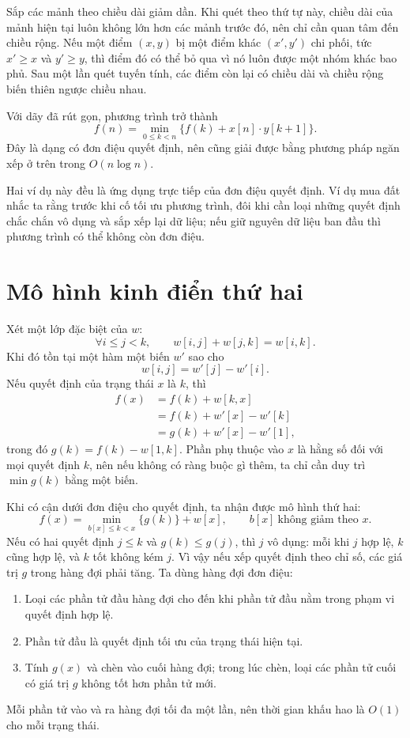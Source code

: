 \documentclass[11pt]{article}
\begin{document}
Sắp các mảnh theo chiều dài giảm dần. Khi quét theo thứ tự này, chiều dài
của mảnh hiện tại luôn không lớn hơn các mảnh trước đó, nên chỉ cần quan tâm
đến chiều rộng. Nếu một điểm $(x,y)$ bị một điểm khác $(x',y')$ chi phối, tức
$x'\ge x$ và $y'\ge y$, thì điểm đó có thể bỏ qua vì nó luôn được một nhóm
khác bao phủ. Sau một lần quét tuyến tính, các điểm còn lại có chiều dài và
chiều rộng biến thiên ngược chiều nhau.

Với dãy đã rút gọn, phương trình trở thành
\[
  f(n)=\min_{0\le k<n}\{f(k)+x[n]\cdot y[k+1]\}.
\]
Đây là dạng có đơn điệu quyết định, nên cũng giải được bằng phương pháp
ngăn xếp ở trên trong $O(n\log n)$.

Hai ví dụ này đều là ứng dụng trực tiếp của đơn điệu quyết định. Ví dụ mua
đất nhắc ta rằng trước khi cố tối ưu phương trình, đôi khi cần loại những
quyết định chắc chắn vô dụng và sắp xếp lại dữ liệu; nếu giữ nguyên dữ liệu
ban đầu thì phương trình có thể không còn đơn điệu.

\section{Mô hình kinh điển thứ hai}

Xét một lớp đặc biệt của $w$:
\[
  \forall i\le j<k,\qquad w[i,j]+w[j,k]=w[i,k].
\]
Khi đó tồn tại một hàm một biến $w'$ sao cho
\[
  w[i,j]=w'[j]-w'[i].
\]
Nếu quyết định của trạng thái $x$ là $k$, thì
\[
\begin{aligned}
  f(x)
    &=f(k)+w[k,x] \\
    &=f(k)+w'[x]-w'[k] \\
    &=g(k)+w'[x]-w'[1],
\end{aligned}
\]
trong đó $g(k)=f(k)-w[1,k]$. Phần phụ thuộc vào $x$ là hằng số đối với mọi
quyết định $k$, nên nếu không có ràng buộc gì thêm, ta chỉ cần duy trì
$\min g(k)$ bằng một biến.

Khi có cận dưới đơn điệu cho quyết định, ta nhận được mô hình thứ hai:
\[
  f(x)=\min_{b[x]\le k<x}\{g(k)\}+w[x],
  \qquad b[x]\ \text{không giảm theo }x.
\]
Nếu có hai quyết định $j\le k$ và $g(k)\le g(j)$, thì $j$ vô dụng: mỗi khi
$j$ hợp lệ, $k$ cũng hợp lệ, và $k$ tốt không kém $j$. Vì vậy nếu xếp quyết
định theo chỉ số, các giá trị $g$ trong hàng đợi phải tăng. Ta dùng hàng đợi
đơn điệu:
\begin{enumerate}
  \item Loại các phần tử đầu hàng đợi cho đến khi phần tử đầu nằm trong phạm
  vi quyết định hợp lệ.
  \item Phần tử đầu là quyết định tối ưu của trạng thái hiện tại.
  \item Tính $g(x)$ và chèn vào cuối hàng đợi; trong lúc chèn, loại các phần
  tử cuối có giá trị $g$ không tốt hơn phần tử mới.
\end{enumerate}
Mỗi phần tử vào và ra hàng đợi tối đa một lần, nên thời gian khấu hao là
$O(1)$ cho mỗi trạng thái.
\end{document}
